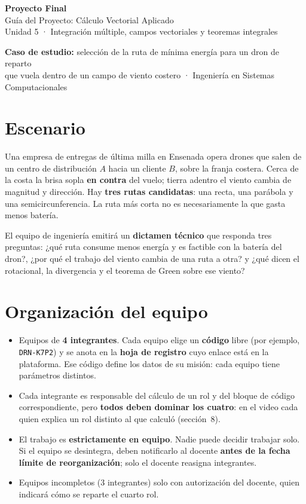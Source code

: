 \documentclass[11pt,letterpaper]{article}
\newcommand{\dest}[1]{\textcolor{accentcolor}{\textbf{#1}}}
\begin{document}
\begin{center}
{\LARGE\bfseries\color{tecnmblue} Proyecto Final}\\[3pt]
{\large Guía del Proyecto: Cálculo Vectorial Aplicado}\\[3pt]
{\normalsize Unidad 5 · Integración múltiple, campos vectoriales y teoremas integrales}\\[8pt]
\colorbox{softblue}{\parbox{0.92\linewidth}{\centering\small
\textbf{Caso de estudio:} selección de la ruta de mínima energía para un dron de reparto\\
que vuela dentro de un campo de viento costero · Ingeniería en Sistemas Computacionales}}
\end{center}

\section{Escenario}
Una empresa de entregas de última milla en Ensenada opera drones que salen de un centro de distribución \(A\) hacia un cliente \(B\), sobre la franja costera. Cerca de la costa la brisa sopla \textbf{en contra} del vuelo; tierra adentro el viento cambia de magnitud y dirección. Hay \textbf{tres rutas candidatas}: una recta, una parábola y una semicircunferencia. La ruta más corta no es necesariamente la que gasta menos batería.

El equipo de ingeniería emitirá un \textbf{dictamen técnico} que responda tres preguntas: ¿qué ruta consume menos energía y es factible con la batería del dron?, ¿por qué el trabajo del viento cambia de una ruta a otra? y ¿qué dicen el rotacional, la divergencia y el teorema de Green sobre ese viento?

\section{Organización del equipo}
\begin{itemize}
\item Equipos de \textbf{4 integrantes}. Cada equipo elige un \textbf{código} libre (por ejemplo, \texttt{DRN-K7P2}) y se anota en la \textbf{hoja de registro} cuyo enlace está en la plataforma. Ese código define los datos de su misión: cada equipo tiene parámetros distintos.
\item Cada integrante es responsable del cálculo de un rol y del bloque de código correspondiente, pero \textbf{todos deben dominar los cuatro}: en el video cada quien explica un rol distinto al que calculó (sección~8).
\item El trabajo es \dest{estrictamente en equipo}. Nadie puede decidir trabajar solo. Si el equipo se desintegra, deben notificarlo al docente \textbf{antes de la fecha límite de reorganización}; solo el docente reasigna integrantes.
\item Equipos incompletos (3 integrantes) solo con autorización del docente, quien indicará cómo se reparte el cuarto rol.
\end{itemize}
\end{document}
